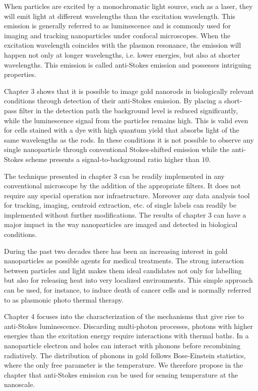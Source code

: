 When particles are excited by a monochromatic light source, such as a laser,
they will emit light at different wavelengths than the excitation wavelength.
This emission is generally referred to as luminescence and is commonly used for
imaging and tracking nanoparticles under confocal microscopes. When the
excitation wavelength coincides with the plasmon resonance, the emission will
happen not only at longer wavelengths, i.e. lower energies, but also at shorter
wavelengths. This emission is called anti-Stokes emission and possesses
intriguing properties.

Chapter 3 shows that it is possible to image gold nanorods in biologically
relevant conditions through detection of their anti-Stokes emission. By placing
a short-pass filter in the detection path the background level is reduced
significantly, while the luminescence signal from the particles remains high.
This is valid even for cells stained with a dye with high quantum yield
that absorbs light of the same wavelengths as the rods. In these conditions it
is not possible to observe any single nanoparticle through conventional
Stokes-shifted emission while the anti-Stokes scheme presents a
signal-to-background ratio higher than $10$.

The technique presented in chapter 3 can be readily implemented in any
conventional microscope by the addition of the appropriate filters. It does not
require any special operation nor infrastructure. Moreover any data analysis
tool for tracking, imaging, centroid extraction, etc. of single labels can
readily be implemented without further modifications. The results of chapter 3
can have a major impact in the way nanoparticles are imaged and detected in
biological conditions.

During the past two decades there has been an increasing interest in gold
nanoparticles as possible agents for medical treatments. The strong interaction
between particles and light makes them ideal candidates not only for labelling
but also for releasing heat into very localized environments. This simple
approach can be used, for instance, to induce death of cancer cells and is
normally referred to as plasmonic photo thermal therapy.

Chapter 4 focuses into the characterization of the mechanisms that give rise to
anti-Stokes luminescence. Discarding multi-photon processes, photons with higher
energies than the excitation energy require interactions with thermal baths. In
a nanoparticle electron and holes can interact with phonons before recombining
radiatively. The distribution of phonons in gold follows Bose-Einstein
statistics, where the only free parameter is the temperature. We
therefore propose in the chapter that anti-Stokes emission can be used for
sensing temperature at the nanoscale.

